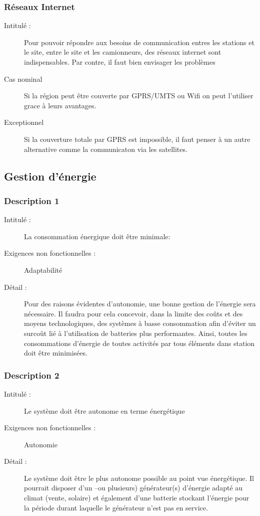 \subsubsection {Réseaux Internet}
\begin{description}
          \item[Intitulé :] Pour pouvoir répondre aux besoins de communication entres les stations et le site, entre le site et les camionneurs, des réseaux internet sont indispensables. Par contre, il faut bien
	envisager les problèmes 
          \item[Cas nominal] Si la région peut être couverte par GPRS/UMTS ou Wifi on peut l'utiliser grace à leurs avantages. 
          \item[Exceptionnel] Si la couverture totale par GPRS est impossible, il faut penser à un autre alternative comme la communicaton via les satellites.
\end{description}

\subsection {Gestion d'énergie}
\subsubsection {Description 1}
\begin{description}
           \item[Intitulé :] La consommation énergique doit être minimale:
           \item[Exigences non fonctionnelles :] Adaptabilité 
           \item[Détail :] Pour des raisons évidentes d'autonomie,  une bonne gestion de l'énergie sera nécessaire. Il faudra pour cela concevoir, dans la limite des coûts et des moyens technologiques, des systèmes à basse consommation afin d'éviter un surcoût lié à l'utilisation de batteries plus performantes. Ainsi, toutes les consommations d’énergie de toutes activités par tous éléments dans station doit être minimisées.  
\end{description}

\subsubsection {Description 2}
\begin{description}
           \item[Intitulé :] Le système doit être autonome en terme énergétique 
           \item[Exigences non fonctionnelles :] Autonomie
           \item[Détail :] Le système doit être le plus autonome possible au point vue énergétique. Il pourrait disposer d’un –ou plusieurs) générateur(s) d’énergie adapté au climat (vente, solaire) et également d’une batterie stockant l'énergie pour la période durant laquelle le générateur n'est pas en service. 
\end{description}


